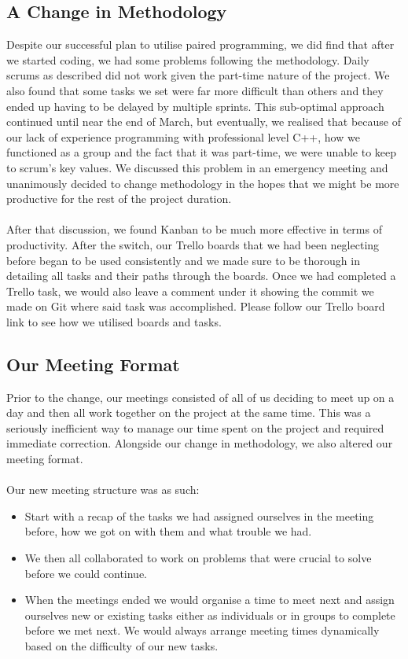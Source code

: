 \documentclass[a4paper]{article}
\begin{document}
\subsection{A Change in Methodology}
Despite our successful plan to utilise paired programming, we did find that after we started coding, we had some problems following the methodology. Daily scrums as described did not work given the part-time nature of the project. We also found that some tasks we set were far more difficult than others and they ended up having to be delayed by multiple sprints. This sub-optimal approach continued until near the end of March, but eventually, we realised that because of our lack of experience programming with professional level C++, how we functioned as a group and the fact that it was part-time, we were unable to keep to scrum's key values. We discussed this problem in an emergency meeting and unanimously decided to change methodology in the hopes that we might be more productive for the rest of the project duration.
\\ \\ 
After that discussion, we found Kanban to be much more effective in terms of productivity. After the switch, our Trello boards that we had been neglecting before began to be used consistently and we made sure to be thorough in detailing all tasks and their paths through the boards. Once we had completed a Trello task, we would also leave a comment under it showing the commit we made on Git where said task was accomplished. Please follow our Trello board link to see how we utilised boards and tasks.

\subsection{Our Meeting Format}
Prior to the change, our meetings consisted of all of us deciding to meet up on a day and then all work together on the project at the same time. This was a seriously inefficient way to manage our time spent on the project and required immediate correction. Alongside our change in methodology, we also altered our meeting format.
\\ \\
Our new meeting structure was as such:
\begin{itemize}
    \item Start with a recap of the tasks we had assigned ourselves in the meeting before, how we got on with them and what trouble we had.
    \item We then all collaborated to work on problems that were crucial to solve before we could continue. 
    \item When the meetings ended we would organise a time to meet next and assign ourselves new or existing tasks either as individuals or in groups to complete before we met next. We would always arrange meeting times dynamically based on the difficulty of our new tasks.
\end{itemize}
\end{document}
